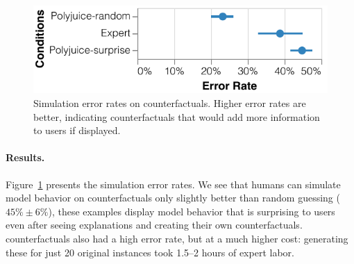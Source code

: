 
\begin{figure}[t]
\centering
\includegraphics[width=1\columnwidth]{figures/err_rate.pdf}
\vspace{-15pt}
\caption{
Simulation error rates on counterfactuals. Higher error rates are better, indicating counterfactuals that would add more information to users if displayed.
}
\vspace{-10pt}
\label{fig:err_rate}
\end{figure}

\paragraph{Results.}
Figure~\ref{fig:err_rate} presents the simulation error rates. 
We see that humans can simulate model behavior on \cshap counterfactuals only slightly better than random guessing ($45\%\pm6\%$), \ie these examples display model behavior that is surprising to users even after seeing explanations and creating their own counterfactuals. \chuman counterfactuals also had a high error rate, but at a much higher cost: generating these for just 20 original instances took 1.5--2 hours of expert labor.


